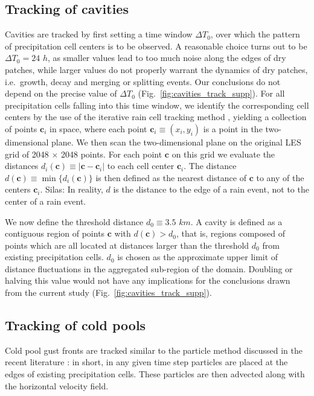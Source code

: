 \documentclass[reprint,amsmath,amssymb]{revtex4-1}
\begin{document}
\subsection{Tracking of cavities}\label{sec:cavity_tracking}
Cavities are tracked by first setting a time window $\Delta T_0$, over which the pattern of precipitation cell centers is to be observed.
A reasonable choice turns out to be $\Delta T_0=24$ $h$, as smaller values lead to too much noise along the edges of dry patches, while larger values do not properly warrant the dynamics of dry patches, i.e.~growth, decay and merging or splitting events.
Our conclusions do not depend on the precise value of $\Delta T_0$ (Fig.~\ref{fig:cavities_track_supp}).
For all precipitation cells falling into this time window, we identify the corresponding cell centers by the use of the iterative rain cell tracking method \cite{moseley2014}, yielding a collection of points $\mathbf{c}_i$ in space, where each point $\mathbf{c}_i \equiv (x_i, y_i)$ is a point in the two-dimensional plane.
We then scan the two-dimensional plane on the original LES grid of 2048 $\times$ 2048 points. 
For each point $\mathbf{c}$ on this grid we evaluate the distances $d_i(\mathbf{c})\equiv|\mathbf{c}-\mathbf{c}_i|$ to each cell center $\mathbf{c}_i$.
The distance $d(\mathbf{c})\equiv \min{\{d_i(\mathbf{c})\}}$ is then defined as the nearest distance of $\mathbf{c}$ to any of the centers $\mathbf{c}_i$. {\color{red} Silas: In reality, $d$ is the distance to the edge of a rain event, not to the center of a rain event.}

We now define the threshold distance $d_0\equiv 3.5$ $km$.
A cavity is defined as a contiguous region of points $\mathbf{c}$ with $d(\mathbf{c})>d_0$, that is, regions composed of points which are all located at distances larger than the threshold $d_0$ from existing precipitation cells.
$d_0$ is chosen as the approximate upper limit of distance fluctuations in the aggregated sub-region of the domain.
Doubling or halving this value would not have any implications for the conclusions drawn from the current study (Fig.~\ref{fig:cavities_track_supp}).

\subsection{Tracking of cold pools}\label{sec:cp_tracking}
Cold pool gust fronts are tracked similar to the particle method discussed in the recent literature \cite{haerter2018reconciling}:
in short, in any given time step particles are placed at the edges of existing precipitation cells. These particles are then advected along with the horizontal velocity field.
\end{document}
